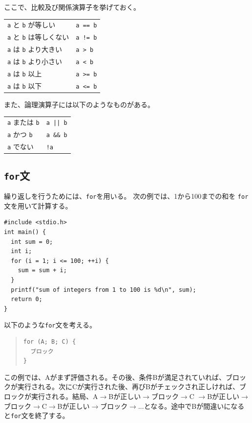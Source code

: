ここで、比較及び関係演算子を挙げておく。
\begin{table}[H]
  \begin{center}
  \begin{tabular}{ll}
    \verb|a| と \verb|b| が等しい      & \verb|a == b| \\
    \verb|a| と \verb|b| は等しくない  & \verb|a != b| \\
    \verb|a| は \verb|b| より大きい    & \verb|a > b|  \\
    \verb|a| は \verb|b| より小さい    & \verb|a < b|  \\
    \verb|a| は \verb|b| 以上          & \verb|a >= b| \\
    \verb|a| は \verb|b| 以下          & \verb|a <= b|
\end{tabular}
\end{center}
\end{table} \noindent
また、論理演算子には以下のようなものがある。
\begin{table}[H]
\begin{center}
\begin{tabular}{ll}
  \verb|a| または \verb|b| & \verb+a || b+ \\
  \verb|a| かつ \verb|b|   & \verb|a && b| \\
  \verb|a| でない  & \verb|!a| \\
\end{tabular}
\end{center}
\end{table}
	
\subsection{{\tt for}文}
繰り返しを行うためには、\verb|for|を用いる。
次の例では、1から100までの和を \verb|for| 文を用いて計算する。
\begin{reidai}\label{ex:for}
\begin{verbatim}
#include <stdio.h>
int main() {
  int sum = 0;
  int i;
  for (i = 1; i <= 100; ++i) {
    sum = sum + i;
  }
  printf("sum of integers from 1 to 100 is %d\n", sum);
  return 0;
}
\end{verbatim}
\end{reidai} \noindent
%
以下のような\verb|for|文を考える。
%
\begin{quote}
\begin{verbatim}
for (A; B; C) {
  ブロック
}
\end{verbatim}
\end{quote}
%
この例では、Aがまず評価される。その後、条件Bが満足されていれば、ブロックが実行される。次にCが実行された後、再びBがチェックされ正しければ、ブロックが実行される。結局、A$\to$Bが正しい$\to$ブロック$\to$C $\to$Bが正しい$\to$ブロック$\to$C$\to$Bが正しい$\to$ブロック$\to$...となる。途中でBが間違いになると\verb|for|文を終了する。

